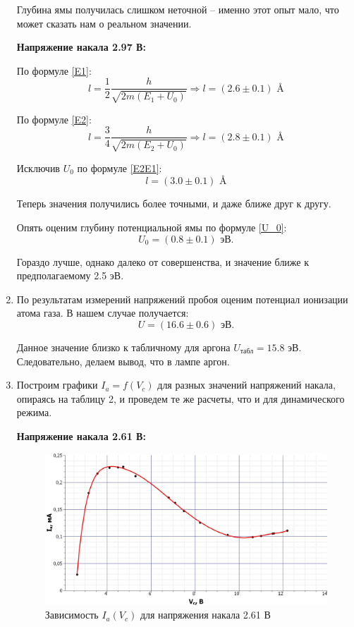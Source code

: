 \documentclass[12pt,a4paper]{article}
\begin{document}
\begin{enumerate}
		Глубина ямы получилась слишком неточной -- именно этот опыт мало, что может сказать нам о реальном значении.
		
		\textbf{Напряжение накала 2.97 В:}
		
		По формуле \eqref{E1}:
		\begin{equation*}
			l = \frac{1}{2}\frac{h}{\sqrt{2m(E_1 + U_0)}} \Longrightarrow l = (2.6 \pm 0.1) \text{ \AA}
		\end{equation*}
		
		По формуле \eqref{E2}:
		\begin{equation*}
			l = \frac{3}{4}\frac{h}{\sqrt{2m(E_2 + U_0)}} \Longrightarrow l = (2.8 \pm 0.1) \text{ \AA}
		\end{equation*}
		
		Исключив $U_0$ по формуле \eqref{E2E1}:
		\begin{equation*}
			l = (3.0 \pm 0.1) \text{ \AA}
		\end{equation*}
		
		Теперь значения получились более точными, и даже ближе друг к другу.
		
		Опять оценим глубину потенциальной ямы по формуле \eqref{U_0}:
		\begin{equation*}
			U_0 = (0.8 \pm 0.1) \text{ эВ}.
		\end{equation*}
		
		Гораздо лучше, однако далеко от совершенства, и значение ближе к предполагаемому 2.5 эВ.
		
		\item По результатам измерений напряжений пробоя оценим потенциал ионизации атома газа. В нашем случае получается:
		\begin{equation*}
			U = (16.6 \pm 0.6) \text{ эВ.} 
		\end{equation*}
	
		Данное значение близко к табличному для аргона $U_\text{табл} = 15.8$ эВ. Следовательно, делаем вывод, что в лампе аргон.
		
		\item Построим графики $I_a = f(V_c)$ для разных значений напряжений накала, опираясь на таблицу 2, и проведем те же расчеты, что и для динамического режима.
		
		\textbf{Напряжение накала 2.61 В:}
		\begin{figure}[h!]
			\centering
			\includegraphics[width=\linewidth]{src/Ia(Vc)_261.jpg}
			\caption{Зависимость $I_a(V_c)$ для напряжения накала 2.61 В}
		\end{figure}
	

\end{enumerate}
\end{document}
